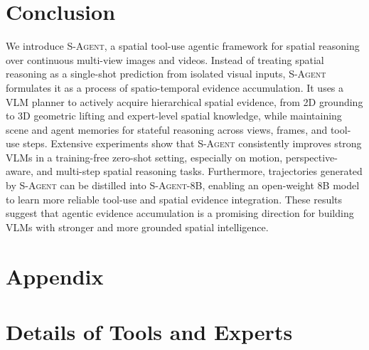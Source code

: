 \documentclass{llmxive}
\begin{document}


\section{Conclusion}
\label{sec:conclusion}

We introduce \textsc{S-Agent}, a spatial tool-use agentic framework for spatial reasoning over continuous multi-view images and videos. 
Instead of treating spatial reasoning as a single-shot prediction from isolated visual inputs, \textsc{S-Agent} formulates it as a process of spatio-temporal evidence accumulation. 
It uses a VLM planner to actively acquire hierarchical spatial evidence, from 2D grounding to 3D geometric lifting and expert-level spatial knowledge, while maintaining scene and agent memories for stateful reasoning across views, frames, and tool-use steps. 
Extensive experiments show that \textsc{S-Agent} consistently improves strong VLMs in a training-free zero-shot setting, especially on motion, perspective-aware, and multi-step spatial reasoning tasks. 
Furthermore, trajectories generated by \textsc{S-Agent} can be distilled into \textsc{S-Agent-8B}, enabling an open-weight 8B model to learn more reliable tool-use and spatial evidence integration. 
These results suggest that agentic evidence accumulation is a promising direction for building VLMs with stronger and more grounded spatial intelligence.




% 
% 


{
\small


}


\appendix

\section*{Appendix}



\section{Details of Tools and Experts}
\label{app:tools}
\end{document}
